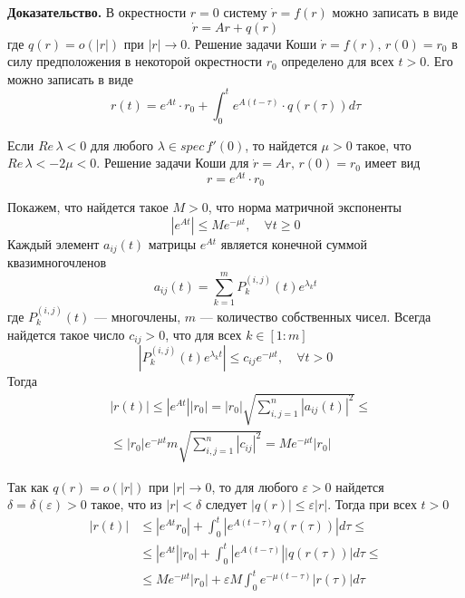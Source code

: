 \documentclass{article}
\begin{document}
\noindent \textbf{Доказательство.} В окрестности $r = 0$ систему $\dot{r} = f(r)$ можно записать в виде
\begin{equation*}
    \dot{r} = Ar + q(r)
\end{equation*}
где $q(r) = o(|r|)$ при $|r| \to 0$. Решение задачи Коши $\dot{r} = f(r),\, r(0) = r_0$ в силу предположения в некоторой окрестности $r_0$ определено для всех $t > 0$. Его можно записать в виде
\begin{equation*}
    r(t) = e^{At}\cdot r_0 + \int_0^t e^{A(t-\tau)}\cdot q(r(\tau))d\tau
\end{equation*}

Если $Re\, \lambda < 0$ для любого $\lambda \in spec\, f'(0)$, то найдется $\mu > 0$ такое, что $Re\, \lambda < -2\mu < 0$. Решение задачи Коши для $\dot{r} = Ar,\, r(0) = r_0$ имеет вид
\begin{equation*}
    r = e^{At}\cdot r_0
\end{equation*}

Покажем, что найдется такое $M > 0$, что норма матричной экспоненты
\begin{equation*}
    |e^{At}| \le Me^{-\mu t}, \quad \forall t \ge 0
\end{equation*}
Каждый элемент $a_{ij}(t)$ матрицы $e^{At}$ является конечной суммой квазимногочленов
\begin{equation*}
    a_{ij}(t) = \sum_{k=1}^m P_k^{(i,j)}(t) e^{\lambda_kt}
\end{equation*}
где $P_k^{(i,j)}(t)$ --- многочлены, $m$ --- количество собственных чисел. Всегда найдется такое число $c_{ij} > 0$, что для всех $k \in [1:m]$
\begin{equation*}
    |P_k^{(i,j)}(t)e^{\lambda_kt}| \le c_{ij}e^{-\mu t}, \quad \forall t > 0
\end{equation*}
Тогда
\begin{equation*}
    \begin{aligned}
        &|r(t)| \le |e^{At}| |r_0| = |r_0| \sqrt{\sum_{i,j=1}^n |a_{ij}(t)|^2} \le\\
        &\le |r_0| e^{-\mu t}m \sqrt{\sum_{i,j=1}^n |c_{ij}|^2} = Me^{-\mu t} |r_0|
    \end{aligned}
\end{equation*}

Так как $q(r) = o(|r|)$ при $|r| \to 0$, то для любого $\varepsilon > 0$ найдется $\delta = \delta(\varepsilon) > 0$ такое, что из $|r| < \delta$ следует $|q(r)| \le \varepsilon|r|$. Тогда при всех $t > 0$
\begin{equation*}
    \begin{aligned}
        |r(t)| &\le |e^{At} r_0| + \int_0^t |e^{A(t - \tau)} q(r(\tau))|d\tau \le\\
        &\le |e^{At}| |r_0| + \int_0^t |e^{A(t - \tau)}| |q(r(\tau))|d\tau \le\\
        &\le Me^{-\mu t} |r_0| + \varepsilon M\int_0^t e^{-\mu (t - \tau)}|r(\tau)|d\tau
    \end{aligned}
\end{equation*}
\end{document}
